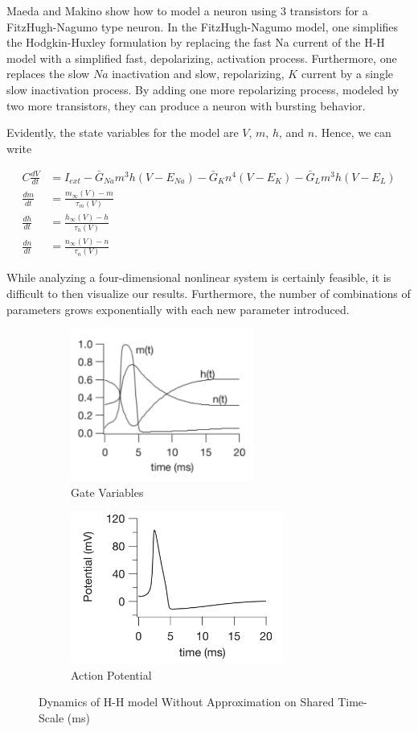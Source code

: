 \documentclass[12]{book}
\newcommand\0{\mathbf{0}}
\newcommand\<{\langle}
\renewcommand\>{\rangle}
\begin{document}
Maeda and Makino \cite{maeda2000pulse} show how to model a neuron using 3 transistors for a FitzHugh-Nagumo type neuron. In the FitzHugh-Nagumo model, one simplifies the Hodgkin-Huxley formulation by replacing the fast Na current of the H-H model with a simplified fast, depolarizing, activation process. Furthermore, one replaces the slow $Na$ inactivation and slow, repolarizing, $K$ current by a single slow inactivation process. By adding one more repolarizing process, modeled by two more transistors, they can produce a neuron with bursting behavior. 

Evidently, the state variables for the model are $V$, $m$, $h$, and $n$. Hence, we can write

\begin{align*}
    C\frac{dV}{dt} &= I_{ext} -\bar{G}_{Na}m^3h(V-E_{Na}) -\bar{G}_{K}n^4(V-E_{K})  -\bar{G}_{L}m^3h(V-E_{L}) \\
    \frac{dm}{dt} &= \frac{m_{\infty}(V)-m}{\tau_m(V)} \\
    \frac{dh}{dt} &= \frac{h_{\infty}(V)-h}{\tau_h(V)} \\
    \frac{dn}{dt} &= \frac{n_{\infty}(V)-n}{\tau_n(V)} 
\end{align*}

While analyzing a four-dimensional nonlinear system is certainly feasible, it is difficult to then visualize our results. Furthermore, the number of combinations of parameters grows exponentially with each new parameter introduced.

\begin{figure}[H]
\centering
\begin{subfigure}{.5\textwidth}
	\centering
	\includegraphics[height=5cm]{keener1.png}
	\caption{Gate Variables}
\end{subfigure}%
\begin{subfigure}{.5\textwidth}
	\centering
	\includegraphics[height=5cm]{keener2.png}
	\caption{Action Potential}
\end{subfigure}
	\caption{Dynamics of H-H model Without Approximation on Shared Time-Scale (ms)}
	\label{fig:keen}
\end{figure}
\end{document}
